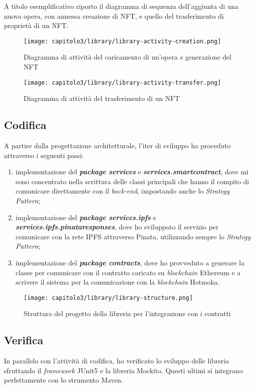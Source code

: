 A titolo esemplificativo riporto il diagramma di sequenza dell'aggiunta di una nuova opera, con annessa creazione di NFT, e quello del trasferimento di proprietà di un NFT.

\begin{figure}[h!]
  \centering
  \texttt{[image: capitolo3/library/library-activity-creation.png]}
  \caption{Diagramma di attività del caricamento di un'opera e generazione del NFT}
\end{figure}

\begin{figure}[h!]
  \centering
  \texttt{[image: capitolo3/library/library-activity-transfer.png]}
  \caption{Diagramma di attività del trasferimento di un NFT}
\end{figure}

\subsection{Codifica}
A partire dalla progettazione architetturale, l'iter di sviluppo ha proceduto attraverso i seguenti passi:
\begin{enumerate}
  \item implementazione del \textbf{\textit{package services}} e \textbf{\textit{services.smartcontract}}, dove mi sono concentrato nella scrittura delle classi principali che hanno il compito di comunicare direttamente con il \textit{back-end}, impostando anche lo \textit{Strategy Pattern};
  \item implementazione del \textbf{\textit{package services.ipfs}} e \textbf{\textit{services.ipfs.pinataresponses}}, dove ho sviluppato il servizio per comunicare con la rete IPFS attraverso Pinata, utilizzando sempre lo \textit{Strategy Pattern};
  \item implementazione del \textbf{\textit{package contracts}}, dove ho provveduto a generare la classe per comunicare con il contratto caricato su \textit{blockchain} Ethereum e a scrivere il sistema per la comunicazione con la \textit{blockchain} Hotmoka.
\end{enumerate}

\begin{figure}[h!]
  \centering
  \texttt{[image: capitolo3/library/library-structure.png]}
  \caption{Struttura del progetto della libreria per l'integrazione con i contratti}
\end{figure}

\subsection{Verifica}
In parallelo con l'attività di codifica, ho verificato lo sviluppo delle libreria sfruttando il \textit{framework} JUnit5 e la libreria Mockito. Questi ultimi si integrano perfettamente con lo strumento Maven.


